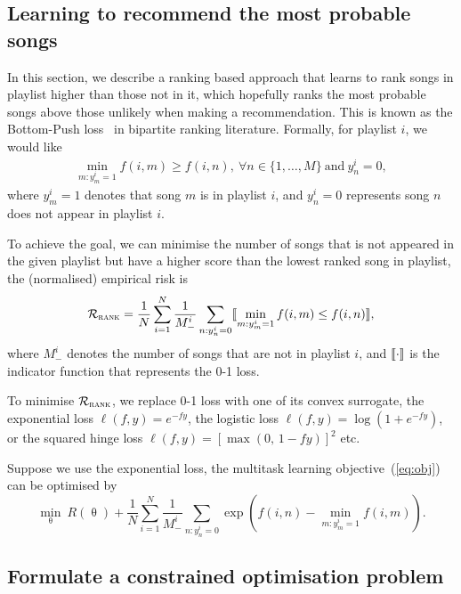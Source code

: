 \subsection{Learning to recommend the most probable songs}
\label{ssec:bploss}

In this section, we describe a ranking based approach that learns to rank songs in playlist higher 
than those not in it, which hopefully ranks the most probable songs above those unlikely when making a recommendation.
This is known as the Bottom-Push loss~\cite{rudin2009p} in bipartite ranking literature.
Formally, for playlist $i$, we would like
\begin{equation*}
\begin{aligned}
\min_{m: y_m^i = 1} f(i, m) \ge f(i, n), \ \forall n \in \{1,\dots,M\} \ \text{and} \ y_n^i = 0,
\end{aligned}
\end{equation*}
where $y_m^i = 1$ denotes that song $m$ is in playlist $i$,
and $y_n^i = 0$ represents song $n$ does not appear in playlist $i$.

To achieve the goal, we can minimise the number of songs that is not appeared in the given playlist
but have a higher score than the lowest ranked song in playlist, \ie the (normalised) empirical risk is
\begin{equation}
\label{eq:bprisk}
\mathcal{R}_\textsc{rank} = \frac{1}{N} \sum_{i=1}^N \frac{1}{M_-^i} \sum_{n: y_n^i = 0} \llbracket \min_{m: y_m^i = 1} f(i, m) \le f(i, n) \rrbracket,
\end{equation}
where $M_-^i$ denotes the number of songs that are not in playlist $i$,
and $\llbracket \cdot \rrbracket$ is the indicator function that represents the 0-1 loss.

To minimise $\mathcal{R}_\textsc{rank}$, we replace 0-1 loss with one of its convex surrogate,
\eg the exponential loss $\ell(f, y) = e^{-fy}$, the logistic loss $\ell(f, y) = \log(1 + e^{-fy})$,
or the squared hinge loss $\ell(f, y) = [\max(0, \, 1 - fy)]^2$ etc.

Suppose we use the exponential loss, the multitask learning objective~(\ref{eq:obj}) can be optimised by
\begin{equation}
\label{eq:expobj}
\min_{\uptheta} \ R(\uptheta) + \frac{1}{N} \sum_{i=1}^N \frac{1}{M_-^i} \sum_{n: y_n^i = 0} \exp \left(f(i, n) - \min_{m: y_m^i = 1} f(i, m) \right).
\end{equation}



\subsection{Formulate a constrained optimisation problem}

